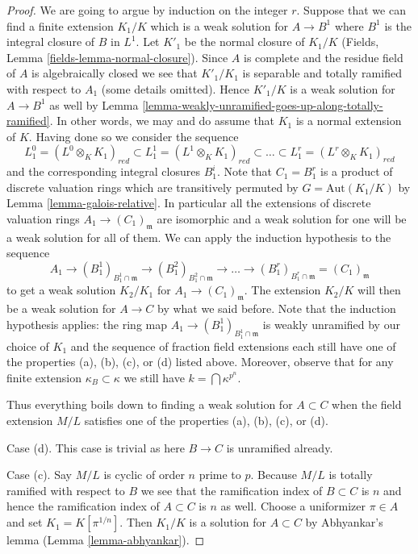 \begin{proof}
\medskip\noindent
We are going to argue by induction on the integer $r$. Suppose that we
can find a finite extension $K_1/K$ which is a weak solution
for $A \to B^1$ where $B^1$ is the integral closure of $B$ in $L^1$.
Let $K'_1$ be the normal closure of $K_1/K$
(Fields, Lemma \ref{fields-lemma-normal-closure}).
Since $A$ is complete and the residue field of $A$ is algebraically closed
we see that $K'_1/K_1$ is separable and totally ramified with
respect to $A_1$ (some details omitted).
Hence $K'_1/K$ is a weak solution for $A \to B^1$ as well by
Lemma \ref{lemma-weakly-unramified-goes-up-along-totally-ramified}.
In other words, we may and do assume that $K_1$ is a normal extension of $K$.
Having done so we consider the sequence
$$
L^0_1 = (L^0 \otimes_K K_1)_{red} \subset
L^1_1 = (L^1 \otimes_K K_1)_{red} \subset \ldots \subset
L^r_1 = (L^r \otimes_K K_1)_{red}
$$
and the corresponding integral closures $B^i_1$. Note that $C_1 = B^r_1$
is a product of discrete valuation rings which are transitively permuted
by $G = \text{Aut}(K_1/K)$ by Lemma \ref{lemma-galois-relative}.
In particular all the extensions of discrete valuation rings
$A_1 \to (C_1)_\mathfrak m$ are isomorphic and a weak solution for one
will be a weak solution for all of them. We can apply the induction
hypothesis to the sequence
$$
A_1 \to (B^1_1)_{B^1_1 \cap \mathfrak m} \to
(B^2_1)_{B^2_1 \cap \mathfrak m} \to
\ldots \to
(B^r_1)_{B^r_1 \cap \mathfrak m} =
(C_1)_\mathfrak m
$$
to get a weak solution $K_2/K_1$ for $A_1 \to (C_1)_\mathfrak m$.
The extension $K_2/K$ will then be a weak solution for $A \to C$
by what we said before. Note that the induction hypothesis applies:
the ring map $A_1 \to (B^1_1)_{B^1_1 \cap \mathfrak m}$
is weakly unramified by our choice of $K_1$
and the sequence of fraction field extensions
each still have one of the properties (a), (b), (c), or (d)
listed above. Moreover, observe that for any finite extension 
$\kappa_B \subset \kappa$ we still have $k = \bigcap \kappa^{p^n}$.

\medskip\noindent
Thus everything boils down to finding a weak solution for $A \subset C$
when the field extension $M/L$ satisfies one of the properties
(a), (b), (c), or (d).

\medskip\noindent
Case (d). This case is trivial as here $B \to C$ is unramified already.

\medskip\noindent
Case (c). Say $M/L$ is cyclic of order $n$ prime to $p$. Because
$M/L$ is totally ramified with respect to $B$ we see that the ramification
index of $B \subset C$ is $n$ and hence the ramification index of $A \subset C$
is $n$ as well. Choose a uniformizer $\pi \in A$ and set
$K_1 = K[\pi^{1/n}]$. Then $K_1/K$ is a solution for $A \subset C$
by Abhyankar's lemma (Lemma \ref{lemma-abhyankar}).


\end{proof}
